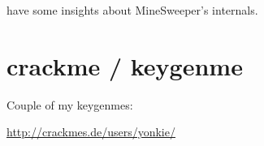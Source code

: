  \cite{trew} 
{have some insights about MineSweeper's internals}.

\section{crackme / keygenme}

{Couple of my \glspl{keygenme}:}

\url{http://crackmes.de/users/yonkie/}

